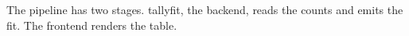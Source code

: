 The pipeline has two stages.
tallyfit, the backend, reads the counts and emits the fit.
The frontend renders the table.
